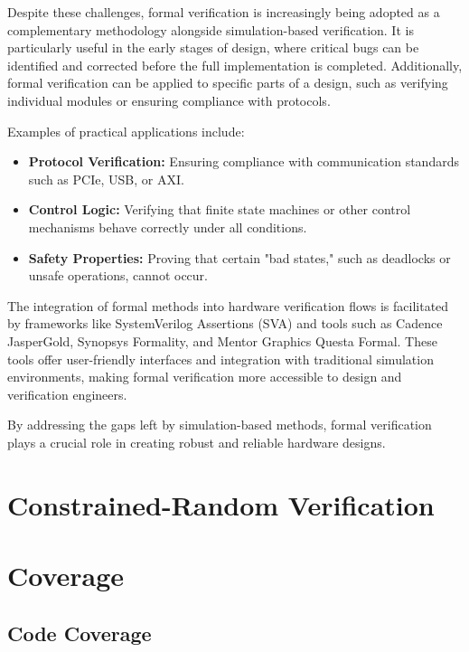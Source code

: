 \documentclass[12pt]{book}
\begin{document}
Despite these challenges, formal verification is increasingly being adopted as a complementary methodology alongside
simulation-based verification. It is particularly useful in the early stages of design, where critical bugs can be
identified and corrected before the full implementation is completed. Additionally, formal verification can be
applied to specific parts of a design, such as verifying individual modules or ensuring compliance with protocols.

Examples of practical applications include:
\begin{itemize}
  \item \textbf{Protocol Verification:} Ensuring compliance with communication standards such as PCIe, USB, or AXI.
  \item \textbf{Control Logic:} Verifying that finite state machines or other control mechanisms behave correctly
    under all conditions.
  \item \textbf{Safety Properties:} Proving that certain "bad states," such as deadlocks or unsafe operations, cannot occur.
\end{itemize}

The integration of formal methods into hardware verification flows is facilitated by frameworks like SystemVerilog
Assertions (SVA) and tools such as Cadence JasperGold, Synopsys Formality, and Mentor Graphics Questa Formal. These
tools offer user-friendly interfaces and integration with traditional simulation environments, making formal
verification more accessible to design and verification engineers.

By addressing the gaps left by simulation-based methods, formal verification plays a crucial role in creating robust
and reliable hardware designs.

\section{Constrained-Random Verification} %

\cite{Mehta2021}

\section{Coverage} %

\subsection{Code Coverage}
\end{document}
